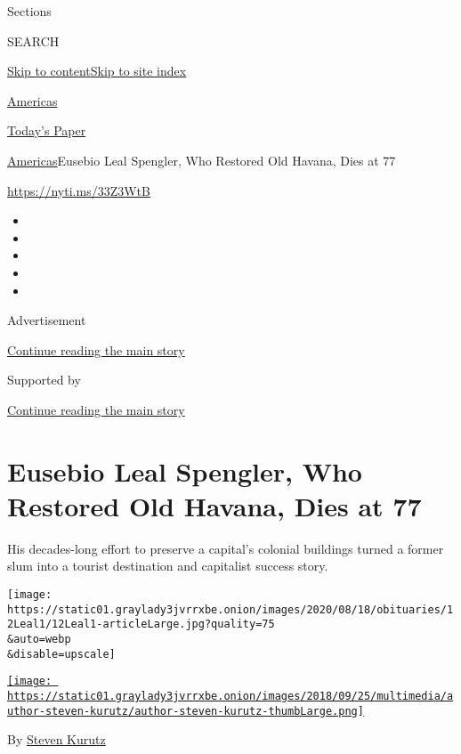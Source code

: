 Sections

SEARCH

\protect\hyperlink{site-content}{Skip to
content}\protect\hyperlink{site-index}{Skip to site index}

\href{https://www.nytimes3xbfgragh.onion/section/world/americas}{Americas}

\href{https://myaccount.nytimes3xbfgragh.onion/auth/login?response_type=cookie\&client_id=vi}{}

\href{https://www.nytimes3xbfgragh.onion/section/todayspaper}{Today's
Paper}

\href{/section/world/americas}{Americas}\textbar{}Eusebio Leal Spengler,
Who Restored Old Havana, Dies at 77

\url{https://nyti.ms/33Z3WtB}

\begin{itemize}
\item
\item
\item
\item
\item
\end{itemize}

Advertisement

\protect\hyperlink{after-top}{Continue reading the main story}

Supported by

\protect\hyperlink{after-sponsor}{Continue reading the main story}

\hypertarget{eusebio-leal-spengler-who-restored-old-havana-dies-at-77}{%
\section{Eusebio Leal Spengler, Who Restored Old Havana, Dies at
77}\label{eusebio-leal-spengler-who-restored-old-havana-dies-at-77}}

His decades-long effort to preserve a capital's colonial buildings
turned a former slum into a tourist destination and capitalist success
story.

\texttt{[image: https://static01.graylady3jvrrxbe.onion/images/2020/08/18/obituaries/12Leal1/12Leal1-articleLarge.jpg?quality=75\\\&auto=webp\\\&disable=upscale]}

\href{https://www.nytimes3xbfgragh.onion/by/steven-kurutz}{\texttt{[image: https://static01.graylady3jvrrxbe.onion/images/2018/09/25/multimedia/author-steven-kurutz/author-steven-kurutz-thumbLarge.png]}}

By \href{https://www.nytimes3xbfgragh.onion/by/steven-kurutz}{Steven
Kurutz}

